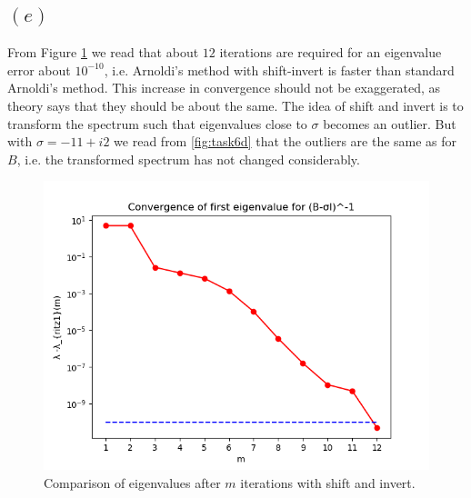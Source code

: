 \subsection{$(e)$}
From Figure \ref{fig:task6e1} we read that about $12$ iterations are required for an eigenvalue error about $10^{-10}$, i.e. Arnoldi's method with shift-invert is faster than standard Arnoldi's method. This increase in convergence should not be exaggerated, as theory says that they should be about the same. The idea of shift and invert is to transform the spectrum such that eigenvalues close to $\sigma$ becomes an outlier. But with $\sigma = -11 + i2$ we read from \ref{fig:task6d} that the outliers are the same as for $B$, i.e. the transformed spectrum has not changed considerably.
\begin{figure}[h!]
\centering
\includegraphics[scale=0.8]{../task6/task6e_eigConv.png}
\caption{Comparison of eigenvalues after $m$ iterations with shift and invert.}
\label{fig:task6e1}
\end{figure}
